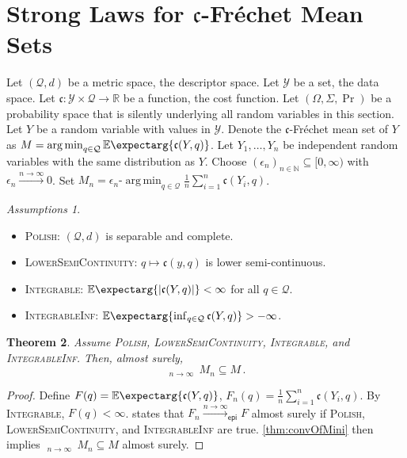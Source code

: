 \documentclass{scrartcl}
\renewcommand{\subset}{\subseteq}
\newcommand{\Ex}{\E\expectarg}
\newcommand*{\mc}[1]{\mathcal{#1}}
\newcommand*{\ms}[1]{\mathsf{#1}}
\newcommand*{\mf}[1]{\mathfrak{#1}}
\newcommand{\N}{\mathbb{N}}
\newcommand{\R}{\mathbb{R}}
\newcommand{\equationFullstop}{\, .}
\newcommand{\eqfs}{\equationFullstop}
\DeclareMathOperator*{\argmin}{arg\,min}
\DeclareMathOperator*{\outerlim}{lim\, \overline{sup}}
\theoremstyle{plain}\newtheorem{theorem}{Theorem}[section]
\theoremstyle{definition}
\theoremstyle{remark}
\newtheorem{assumptions}[theorem]{Assumptions}
\begin{document}
 \section{Strong Laws for $\mf c$-Fréchet Mean Sets}\label{sec:gen}
Let $(\mc Q, d)$ be a metric space, the descriptor space. Let $\mc Y$ be a set, the data space. Let $\mf c\colon \mc Y \times\mc Q \to \R$ be a function, the cost function. Let $(\Omega, \Sigma, \Pr)$ be a probability space that is silently underlying all random variables in this section. Let $Y$ be a random variable with values in $\mc Y$. Denote the $\mf c$-Fréchet mean set of $Y$ as $M = \argmin_{q\in\mc Q} \Ex{\mf c(Y, q)}$.
Let $Y_1, \dots, Y_n$ be independent random variables with the same distribution as $Y$.
Choose $(\epsilon_n)_{n\in\N}\subset [0,\infty)$ with $\epsilon_n \xrightarrow{n\to\infty}0$. Set $M_n = \epsilon_n\text{-}\argmin_{q\in\mc Q} \frac{1}n \sum_{i=1}^n \mf c(Y_i, q)$.
\begin{assumptions}\mbox{ }
\begin{itemize}
\item 
	\textsc{Polish}: 
	$(\mc Q, d)$ is separable and complete.
\item 
	\textsc{LowerSemiContinuity}: 
	$q \mapsto \mf c(y, q)$ is lower semi-continuous.
\item 
	\textsc{Integrable}: 
	$\Ex{\abs{\mf c(Y, q)}} < \infty$ for all $q\in\mc Q$.
\item 
	\textsc{IntegrableInf}: 
	$\Ex{\inf_{q \in \mc Q}\mf c(Y, q)} > - \infty$.
\end{itemize}
\end{assumptions}
\begin{theorem}\label{thm:epi}
	Assume \textsc{Polish}, \textsc{LowerSemiContinuity}, \textsc{Integrable}, and \textsc{IntegrableInf}.
	Then, almost surely,
	\begin{equation*}
		\outerlim_{n\to\infty}\, M_n \subset M
		\eqfs
	\end{equation*}
\end{theorem}
\begin{proof}
Define $F(q) = \Ex{\mf c(Y, q)}$, $F_n(q) = \frac{1}n\sum_{i=1}^n \mf c(Y_i, q)$. By \textsc{Integrable}, $F(q)<\infty$.
\cite[Theorem 1.1]{korf01} states that $F_n \xrightarrow{n\to\infty}_{\ms{epi}} F$ almost surely if \textsc{Polish}, \textsc{LowerSemiContinuity}, and \textsc{IntegrableInf} are true. \autoref{thm:convOfMini} then implies $\outerlim_{n\to\infty}\, M_n \subset M$ almost surely.
\end{proof}
\end{document}
